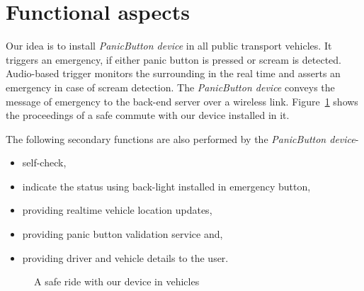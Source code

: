 \section{Functional aspects}
Our idea is to install \emph{PanicButton device} in all public transport vehicles. It triggers an emergency, if either panic button is pressed or scream is detected. Audio-based trigger monitors the surrounding in the real time and asserts an emergency in case of scream detection. The \emph{PanicButton device} conveys the message of emergency to the back-end server over a wireless link.
Figure~\ref{fig:safecommute} shows the proceedings of a safe commute with our device installed in it.

The following secondary functions are also performed by the \emph{PanicButton device}-
\begin{itemize}
\item self-check,
\item indicate the status using back-light installed in emergency button,
\item providing realtime vehicle location updates,  
\item providing panic button validation service and,
\item providing driver and vehicle details to the user.
\end{itemize}

\begin{figure}[H]
\centering
\def\svgwidth{\textwidth}

\caption{A safe ride with our device in vehicles}
\label{fig:safecommute}
\end{figure}
 


